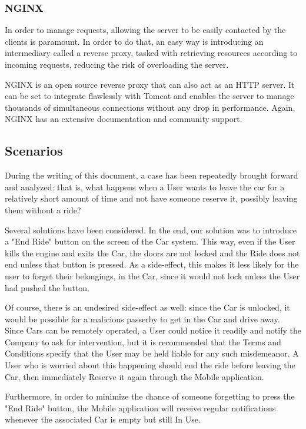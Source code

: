 \documentclass[12pt]{article}
\begin{document}
\subsubsection{NGINX}
In order to manage requests, allowing the server to be easily contacted by the clients is paramount. In order to do that, an easy way is introducing an intermediary called a reverse proxy, tasked with retrieving resources according to incoming requests, reducing the risk of overloading the server.

NGINX is an open source reverse proxy that can also act as an HTTP server. It can be set to integrate flawlessly with Tomcat and enables the server to manage thousands of simultaneous connections without any drop in performance. Again, NGINX has an extensive documentation and community support.

\subsection{Scenarios}
During the writing of this document, a case has been repeatedly brought forward and analyzed: that is, what happens when a User wants to leave the car for a relatively short amount of time and not have someone reserve it, possibly leaving them without a ride?

Several solutions have been considered. In the end, our solution was to introduce a "End Ride" button on the screen of the Car system. This way, even if the User kills the engine and exits the Car, the doors are not locked and the Ride does not end unless that button is pressed. As a side-effect, this makes it less likely for the user to forget their belongings, in the Car, since it would not lock unless the User had pushed the button.

Of course, there is an undesired side-effect as well: since the Car is unlocked, it would be possible for a malicious passerby to get in the Car and drive away. Since Cars can be remotely operated, a User could notice it readily and notify the Company to ask for intervention, but it is recommended that the Terms and Conditions specify that the User may be held liable for any such misdemeanor. A User who is worried about this happening should end the ride before leaving the Car, then immediately Reserve it again through the Mobile application.

Furthermore, in order to minimize the chance of someone forgetting to press the "End Ride" button, the Mobile application will receive regular notifications whenever the associated Car is empty but still In Use.
\end{document}
